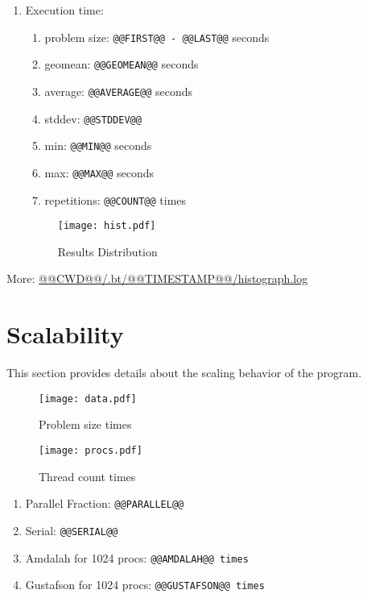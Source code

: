 \documentclass[a4paper]{article}
\begin{document}
\begin{enumerate}
\item Execution time:
\begin{enumerate}
\item problem size: {\tt @@FIRST@@ - @@LAST@@} seconds
\item geomean: {\tt @@GEOMEAN@@} seconds
\item average: {\tt @@AVERAGE@@} seconds
\item stddev: {\tt @@STDDEV@@}
\item min: {\tt @@MIN@@} seconds
\item max: {\tt @@MAX@@} seconds
\item repetitions: {\tt @@COUNT@@} times
\end{enumerate}

\begin{figure}[H]
\label{fig:histogram}
\centering
\texttt{[image: hist.pdf]}
\caption{Results Distribution}
\end{figure}

\end{enumerate}

More: \href{@@CWD@@/.bt/@@TIMESTAMP@@/histograph.log}{@@CWD@@/.bt/@@TIMESTAMP@@/histograph.log}

\section{Scalability}

This section provides details about the scaling behavior of the program.

\begin{figure}[H]
\label{fig:scaling}
\centering
\texttt{[image: data.pdf]}
\caption{Problem size times}
\end{figure}

\begin{figure}[H]
\label{fig:normal}
\centering
\texttt{[image: procs.pdf]}
\caption{Thread count times}
\end{figure}

\begin{enumerate}
\item Parallel Fraction: {\tt @@PARALLEL@@}
\item Serial: {\tt @@SERIAL@@}
\item Amdalah for 1024 procs: {\tt @@AMDALAH@@ times}
\item Gustafson for 1024 procs: {\tt @@GUSTAFSON@@ times}
\end{enumerate}
\end{document}
